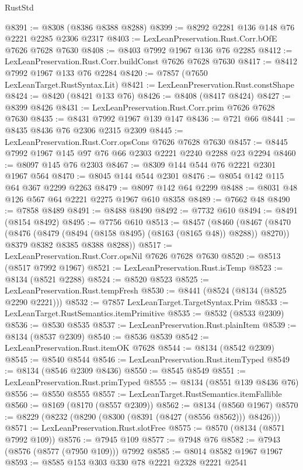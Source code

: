 \begin{lexlean}{RustStd}
\begin{coremodule}
@8391 := @8308 (@8386 @8388 @8288)
@8399 := @8292 @2281 @136 @148 @76 @2221 @2285 @2306 @2317
@8403 := LexLeanPreservation.Rust.Corr.bOfE @7626 @7628 @7630
@8408 := @8403 @7992 @1967 @136 @76 @2285
@8412 := LexLeanPreservation.Rust.Corr.buildConst @7626 @7628 @7630
@8417 := @8412 @7992 @1967 @133 @76 @2284
@8420 := @7857 (@7650 LexLeanTarget.RustSyntax.Lit)
@8421 := LexLeanPreservation.Rust.constShape
@8424 := @8420 (@8421 @133 @76)
@8426 := @8408 (@8417 @8424)
@8427 := @8399 @8426
@8431 := LexLeanPreservation.Rust.Corr.prim @7626 @7628 @7630
@8435 := @8431 @7992 @1967 @139 @147
@8436 := @721 @66
@8441 := @8435 @8436 @76 @2306 @2315 @2309
@8445 := LexLeanPreservation.Rust.Corr.opsCons @7626 @7628 @7630
@8457 := @8445 @7992 @1967 @145 @97 @76 @66 @2303 @2221 @2240 @2288 @23 @2294
@8460 := @8097 @145 @76 @2303
@8467 := @8309 @144 @544 @76 @2221 @2301 @1967 @564
@8470 := @8045 @144 @544 @2301
@8476 := @8054 @142 @115 @64 @367 @2299 @2263
@8479 := @8097 @142 @64 @2299
@8488 := @8031 @48 @126 @567 @64 @2221 @2275 @1967 @610 @8358
@8489 := @7662 @48
@8490 := @7858 @8489
@8491 := @8488 @8490
@8492 := @7732 @610
@8494 := @8491 (@8154 @8492)
@8495 := @7756 @610
@8513 := @8457
    (@8460
      (@8467
        (@8470 (@8476 (@8479 (@8494 (@8158 @8495) (@8163 (@8165 @48)) @8288)) @8270))
        @8379
        @8382
        @8385
        @8388
        @8288))
@8517 := LexLeanPreservation.Rust.Corr.opsNil @7626 @7628 @7630
@8520 := @8513 (@8517 @7992 @1967)
@8521 := LexLeanPreservation.Rust.isTemp
@8523 := @8134 (@8521 @2288)
@8524 := @8520 @8523
@8525 := LexLeanPreservation.Rust.tempFresh
@8530 := @8441 (@8524 (@8134 (@8525 @2290 @2221)))
@8532 := @7857 LexLeanTarget.TargetSyntax.Prim
@8533 := LexLeanTarget.RustSemantics.itemPrimitive
@8535 := @8532 (@8533 @2309)
@8536 := @8530 @8535
@8537 := LexLeanPreservation.Rust.plainItem
@8539 := @8134 (@8537 @2309)
@8540 := @8536 @8539
@8542 := LexLeanPreservation.Rust.itemOK @7628
@8544 := @8134 (@8542 @2309)
@8545 := @8540 @8544
@8546 := LexLeanPreservation.Rust.itemTyped
@8549 := @8134 (@8546 @2309 @8436)
@8550 := @8545 @8549
@8551 := LexLeanPreservation.Rust.primTyped
@8555 := @8134 (@8551 @139 @8436 @76)
@8556 := @8550 @8555
@8557 := LexLeanTarget.RustSemantics.itemFallible
@8560 := @8169 (@8170 (@8557 @2309))
@8562 := @8134 (@8560 @1967)
@8570 := @8229 (@8232 (@8290 (@8300 (@8391 (@8427 (@8556 @8562))) @8426)))
@8571 := LexLeanPreservation.Rust.slotFree
@8575 := @8570 (@8134 (@8571 @7992 @109))
@8576 := @7945 @109
@8577 := @7948 @76
@8582 := @7943 (@8576 (@8577 (@7950 @109))) @7992
@8585 := @8014 @8582 @1967 @1967
@8593 := @8585 @153 @303 @330 @78 @2221 @2328 @2221 @2541

\end{coremodule}
\end{lexlean}
